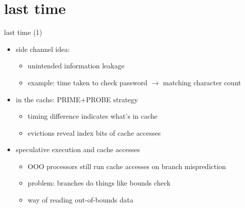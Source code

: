 \date{}
\title{}
\date{}

\begin{frame}
    \titlepage
\end{frame}


\section{last time}
\begin{frame}{last time (1)}
    \begin{itemize}
    \item side channel idea:
        \begin{itemize}
        \item unintended information leakage
        \item example: time taken to check password $\rightarrow$ matching character count
        \end{itemize}
    \item in the cache: PRIME+PROBE strategy
        \begin{itemize}
        \item timing difference indicates what's in cache
        \item evictions reveal index bits of cache accesses
        \end{itemize}
    \item speculative execution and cache accesses
        \begin{itemize}
        \item OOO processors still run cache accesses on branch misprediction
        \item problem: branches do things like bounds check
        \item way of reading out-of-bounds data
        \end{itemize}
    \end{itemize}
\end{frame}


